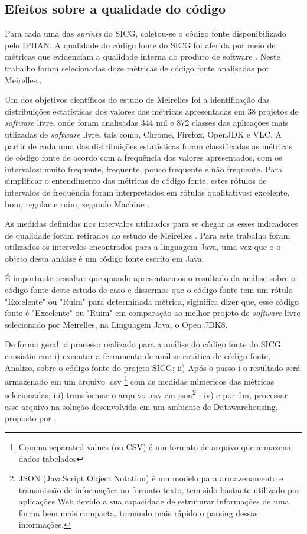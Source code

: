 \subsection[Efeitos sobre a qualidade do código]{Efeitos sobre a qualidade do código}

Para cada uma das \textit{sprints} do SICG, coletou-se o código fonte disponibilizado pelo IPHAN. A qualidade do código fonte do SICG foi aferida por meio de métricas que evidenciam a qualidade interna do produto de software \cite{ISO25023}. Neste trabalho foram selecionadas doze métricas de código fonte analisadas  por Meirelles \cite{Meirelles2013}. 


Um dos objetivos científicos do estudo de Meirelles foi a identificação das distribuições estatísticas dos valores das métricas apresentadas em 38 projetos de \textit{software} livre, onde foram analisadas 344 mil e 872 classes das aplicações mais utlizadas de \textit{software} livre, tais como, Chrome, Firefox, OpenJDK e VLC. A partir de cada uma das distribuições estatísticas foram classificadas as métricas de código fonte de acordo com a frequência dos valores apresentados,
com os intervalos: muito frequente, frequente, pouco frequente e não frequente. Para simplificar o entendimento das métricas de código fonte, estes rótulos de
intervalos de frequência foram interpretados em rótulos qualitativos: excelente, bom, regular e ruim, segundo Machine \cite{Machini2010}.


As medidas definidas nos intervalos utilizados para se chegar as esses indicadores de qualidade foram retirados do
estudo de Meirelles \cite{Meirelles2013}. Para este trabalho foram utilizados os intervalos encontrados para a linguagem Java, uma vez que o o objeto desta análise é um código fonte escrito em Java.

É importante ressaltar que quando apresentarmos o resultado da análise sobre o código fonte deste estudo de caso e dissermos que o código fonte tem um rótulo "Excelente" ou "Ruim" para determinada métrica, siginifica dizer que, esse código fonte é "Excelente" ou "Ruim" em comparação ao melhor projeto de \textit{software} livre selecionado por Meirelles, na Linguagem Java, o Open JDK8.


De forma geral, o processo realizado para a análise do código fonte do SICG consistiu em: i) executar a ferramenta de análise estática de código fonte, Analizo, sobre o código fonte do projeto SICG; ii) Após o passo i o resultado será armazenado em um arquivo .csv \footnote{Comma-separated values (ou CSV) é um formato de arquivo que armazena dados tabelados} com as medidas númericos das métricas selecionadas; iii) transformar o arquivo .csv em json\footnote{JSON (JavaScript Object Notation) é um modelo para armazenamento e transmissão de informações no formato texto, tem sido bastante utilizado por aplicações Web devido a sua capacidade de estruturar informações de uma forma bem mais compacta, tornando mais rápido o parsing dessas informações.} ; iv) e por fim, processar esse arquivo na solução desenvolvida em um ambiente de Datawarehousing, proposto por \cite{Baufaker2014}.

